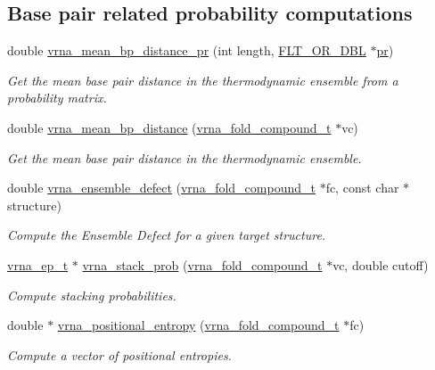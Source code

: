 \subsection*{Base pair related probability computations}
\begin{DoxyCompactItemize}
\item 
double \mbox{\hyperlink{group__part__func__global_gad3f0c240512e6d43e2e4d4c2076021f5}{vrna\+\_\+mean\+\_\+bp\+\_\+distance\+\_\+pr}} (int length, \mbox{\hyperlink{group__data__structures_ga31125aeace516926bf7f251f759b6126}{F\+L\+T\+\_\+\+O\+R\+\_\+\+D\+BL}} $\ast$\mbox{\hyperlink{fold__vars_8h_ac98ec419070aee6831b44e5c700f090f}{pr}})
\begin{DoxyCompactList}\small\item\em Get the mean base pair distance in the thermodynamic ensemble from a probability matrix. \end{DoxyCompactList}\item 
double \mbox{\hyperlink{group__part__func__global_gaa6b8983b559b9ef4b2e1b31113ea317b}{vrna\+\_\+mean\+\_\+bp\+\_\+distance}} (\mbox{\hyperlink{group__fold__compound_ga1b0cef17fd40466cef5968eaeeff6166}{vrna\+\_\+fold\+\_\+compound\+\_\+t}} $\ast$vc)
\begin{DoxyCompactList}\small\item\em Get the mean base pair distance in the thermodynamic ensemble. \end{DoxyCompactList}\item 
double \mbox{\hyperlink{group__part__func__global_gaaf197722d1faa86af5e7b4240acafdee}{vrna\+\_\+ensemble\+\_\+defect}} (\mbox{\hyperlink{group__fold__compound_ga1b0cef17fd40466cef5968eaeeff6166}{vrna\+\_\+fold\+\_\+compound\+\_\+t}} $\ast$fc, const char $\ast$structure)
\begin{DoxyCompactList}\small\item\em Compute the Ensemble Defect for a given target structure. \end{DoxyCompactList}\item 
\mbox{\hyperlink{group__struct__utils__plist_gab9ac98ab55ded9fb90043b024b915aca}{vrna\+\_\+ep\+\_\+t}} $\ast$ \mbox{\hyperlink{group__part__func__global_ga132664bf29fdc30bb5ea715491d1ab22}{vrna\+\_\+stack\+\_\+prob}} (\mbox{\hyperlink{group__fold__compound_ga1b0cef17fd40466cef5968eaeeff6166}{vrna\+\_\+fold\+\_\+compound\+\_\+t}} $\ast$vc, double cutoff)
\begin{DoxyCompactList}\small\item\em Compute stacking probabilities. \end{DoxyCompactList}\item 
double $\ast$ \mbox{\hyperlink{group__part__func__global_ga4ec346141028c7bcd15bc235c408b6e9}{vrna\+\_\+positional\+\_\+entropy}} (\mbox{\hyperlink{group__fold__compound_ga1b0cef17fd40466cef5968eaeeff6166}{vrna\+\_\+fold\+\_\+compound\+\_\+t}} $\ast$fc)
\begin{DoxyCompactList}\small\item\em Compute a vector of positional entropies. \end{DoxyCompactList}\end{DoxyCompactItemize}
